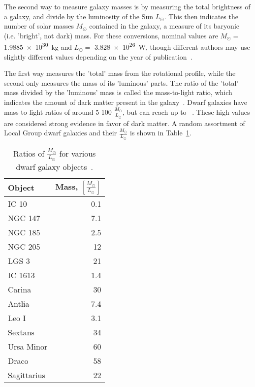     The second way to measure galaxy masses is by measuring the total brightness of a galaxy, and divide by the luminosity of the Sun $L_\odot$.
    This then indicates the number of solar masses $M_\odot$ contained in the galaxy, a measure of its baryonic (i.e. 'bright', not dark) mass.
    For these conversions, nominal values are $M_\odot =$ \SI{1.9885e30}{kg} and $L_\odot =$ \SI{3.828e26}{W}, though different authors may use slightly different values depending on the year of publication~\cite{iau_solarconstants}.
    
    The first way measures the 'total' mass from the rotational profile, while the second only measures the mass of its 'luminous' parts.
    The ratio of the 'total' mass divided by the 'luminous' mass is called the mass-to-light ratio, which indicates the amount of dark matter present in the galaxy~\cite{faber_ml}.
    Dwarf galaxies have mass-to-light ratios of around 5-100 $\frac{M_\odot}{L_\odot}$, but can reach up to ~\cite{Simon2007_dwarfgalaxykeck}.
    These high values are considered strong evidence in favor of dark matter.
    A random assortment of Local Group dwarf galaxies and their $\frac{M_\odot}{L_\odot}$ is shown in Table~\ref{tab:mlratios:dwarfgals}.
    
    \begin{table}[]
      \centering
      \caption[Ratios of $\frac{M_\odot}{L_\odot}$ for Various Dwarf Galaxy Objects]{Ratios of $\frac{M_\odot}{L_\odot}$ for various dwarf galaxy objects~\cite{localdwarfs}.}
      \label{tab:mlratios:dwarfgals}
      \begin{tabular}{l r}
        Object      &  Mass, $\left [ \frac{M_\odot}{L_\odot} \right ]$ \\
        \hline
        IC 10       &  0.1 \\
        NGC 147     &  7.1 \\
        NGC 185     &  2.5 \\
        NGC 205     & 12   \\
        LGS 3       & 21   \\
        IC 1613     &  1.4 \\
        Carina      & 30   \\
        Antlia      &  7.4 \\
        Leo I       &  3.1 \\
        Sextans     & 34   \\
        Ursa Minor  & 60   \\
        Draco       & 58   \\
        Sagittarius & 22   \\
      \end{tabular}
    \end{table}
    
